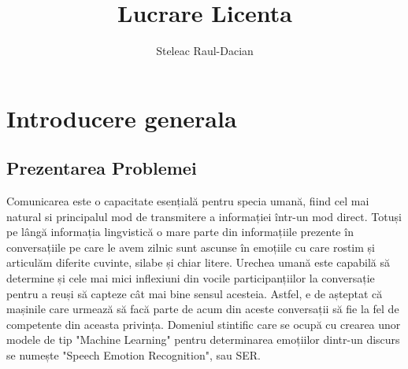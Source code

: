 \documentclass[a4paper,12pt, twoside]{book}
\title{Lucrare Licenta}
\author{Steleac Raul-Dacian}
\begin{document}
	\maketitle
	\thispagestyle{empty}
	\tableofcontents
	\thispagestyle{empty}
	\clearpage
	\thispagestyle{empty}
	
	\chapter{Introducere generala}
	
		\section{Prezentarea Problemei}
						
			\setlength{\parindent}{0.8cm}
			
			Comunicarea este o capacitate esențială pentru specia umană, fiind cel mai natural si principalul mod de transmitere a informației într-un mod direct. Totuși pe lângă informația lingvistică o mare parte din informațiile prezente în conversațiile pe care le avem zilnic sunt ascunse în emoțiile cu care rostim și articulăm diferite cuvinte, silabe și chiar litere. Urechea umană este capabilă să determine și cele mai mici inflexiuni din vocile participanțiilor la conversație pentru a reuși să capteze cât mai bine sensul acesteia. Astfel, e de așteptat că mașinile care urmează să facă parte de acum din aceste conversații să fie la fel de competente din aceasta privința. Domeniul stintific care se ocupă cu crearea unor modele de tip "Machine Learning" pentru determinarea emoțiilor dintr-un discurs se numește "Speech Emotion Recognition", sau SER. \par	
			
\end{document}
